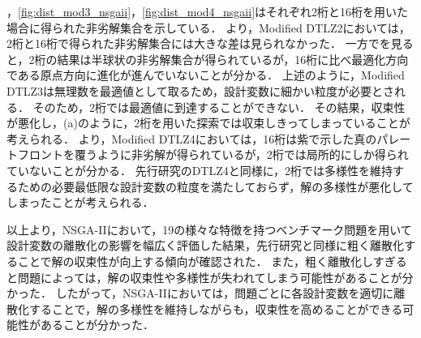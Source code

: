 \documentclass[../main/main]{subfiles}
\begin{document}
，\ref{fig:dist_mod3_nsgaii}，\ref{fig:dist_mod4_nsgaii}はそれぞれ2桁と16桁を用いた場合に得られた非劣解集合を示している．
より，Modified DTLZ2においては，2桁と16桁で得られた非劣解集合には大きな差は見られなかった．
一方でを見ると，2桁の結果は半球状の非劣解集合が得られているが，16桁に比べ最適化方向である原点方向に進化が進んでいないことが分かる．
上述のように，Modified DTLZ3は無理数を最適値として取るため，設計変数に細かい粒度が必要とされる．
そのため，2桁では最適値に到達することができない．
その結果，収束性が悪化し，(a)のように，2桁を用いた探索では収束しきってしまっていることが考えられる．
より，Modified DTLZ4においては，16桁は紫で示した真のパレートフロントを覆うように非劣解が得られているが，2桁では局所的にしか得られていないことが分かる．
先行研究のDTLZ4と同様に，2桁では多様性を維持するための必要最低限な設計変数の粒度を満たしておらず，解の多様性が悪化してしまったことが考えられる．

以上より，NSGA-IIにおいて，19の様々な特徴を持つベンチマーク問題を用いて設計変数の離散化の影響を幅広く評価した結果，先行研究と同様に粗く離散化することで解の収束性が向上する傾向が確認された．
また，粗く離散化しすぎると問題によっては，解の収束性や多様性が失われてしまう可能性があることが分かった．
したがって，NSGA-IIにおいては，問題ごとに各設計変数を適切に離散化することで，解の多様性を維持しながらも，収束性を高めることができる可能性があることが分かった．
%
%
\end{document}
